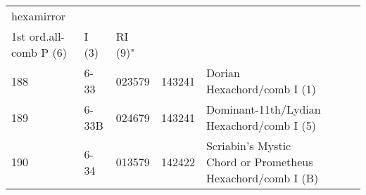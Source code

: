 \begin{table}[h]
\begin{tabular}{lllll}
hexamirror             &                     &         &           &                                                            &                             &                   &      &     \\
1st ord.all-comb P (6) & I (3)               & RI (9)" &           &                                                            &                             &                   &      &     \\
188                    & 6-33                & 023579  & 143241    & Dorian Hexachord/comb I (1)                                &                             &                   &      &     \\
189                    & 6-33B               & 024679  & 143241    & Dominant-11th/Lydian Hexachord/comb I (5)                  &                             &                   &      &     \\
190                    & 6-34                & 013579  & 142422    & Scriabin's Mystic Chord or Prometheus Hexachord/comb I (B) &                             &                   &      &    

\end{tabular}
\end{table}

